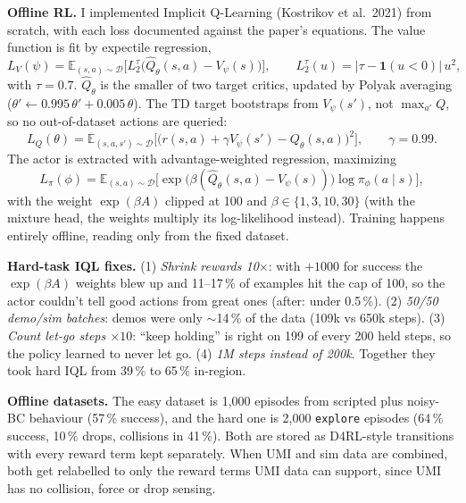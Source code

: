 \documentclass[10pt]{article}
\newcommand{\pct}{\,\%}
\newcommand{\para}[1]{\textbf{#1}}
\begin{document}
\para{Offline RL.} I implemented Implicit Q-Learning (Kostrikov et al.\ 2021) from scratch, with each
loss documented against the paper's equations. The value function is fit by expectile regression,
\begin{equation}
  L_V(\psi) = \mathbb{E}_{(s,a)\sim\mathcal{D}}\big[L_2^\tau\big(\hat{Q}_\theta(s,a) - V_\psi(s)\big)\big],
  \qquad L_2^\tau(u) = |\tau - \mathbf{1}(u < 0)|\,u^2,
\end{equation}
with $\tau = 0.7$. $\hat{Q}_\theta$ is the smaller of two target critics, updated by Polyak averaging
($\theta' \leftarrow 0.995\,\theta' + 0.005\,\theta$). The TD target bootstraps from $V_\psi(s')$, not
$\max_{a'} Q$, so no out-of-dataset actions are queried:
\begin{equation}
  L_Q(\theta) = \mathbb{E}_{(s,a,s')\sim\mathcal{D}}\big[\big(r(s,a) + \gamma V_\psi(s') - Q_\theta(s,a)\big)^2\big],
  \qquad \gamma = 0.99.
\end{equation}
The actor is extracted with advantage-weighted regression, maximizing
\begin{equation}
  L_\pi(\phi) = \mathbb{E}_{(s,a)\sim\mathcal{D}}\big[\exp\big(\beta(\hat{Q}_\theta(s,a) - V_\psi(s))\big)
  \log \pi_\phi(a \mid s)\big],
\end{equation}
with the weight $\exp(\beta A)$ clipped at 100 and $\beta \in \{1, 3, 10, 30\}$ (with the mixture head, the weights multiply its log-likelihood instead).
Training happens entirely offline, reading only from the fixed dataset.

\para{Hard-task IQL fixes.} (1) \emph{Shrink rewards 10$\times$}: with $+1000$ for success the $\exp(\beta A)$ weights blew up and 11--17\pct{} of examples hit the cap of 100, so the actor couldn't tell good actions from great ones (after: under 0.5\pct). (2) \emph{50/50 demo/sim batches}: demos were only ${\sim}$14\pct{} of the data (109k vs 650k steps). (3) \emph{Count let-go steps $\times 10$}: ``keep holding'' is right on 199 of every 200 held steps, so the policy learned to never let go. (4) \emph{1M steps instead of 200k}. Together they took hard IQL from 39\pct{} to 65\pct{} in-region.

\para{Offline datasets.} The easy dataset is 1,000 episodes from scripted plus noisy-BC behaviour
(57\pct{} success), and the hard one is 2,000 \texttt{explore} episodes (64\pct{} success, 10\pct{} drops,
collisions in 41\pct). Both are stored as D4RL-style transitions with every reward term kept separately. When
UMI and sim data are combined, both get relabelled to only the reward terms UMI data can support, since UMI
has no collision, force or drop sensing.
\end{document}

